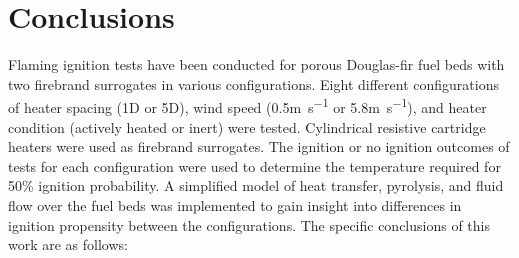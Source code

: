 \section{Conclusions}
    Flaming ignition tests have been conducted for porous Douglas-fir fuel beds with two firebrand surrogates in various configurations. Eight different configurations of heater spacing (1D or 5D), wind speed (0.5\si{\meter\per\second} or 5.8\si{\meter\per\second}), and heater condition (actively heated or inert) were tested. Cylindrical resistive cartridge heaters were used as firebrand surrogates. The ignition or no ignition outcomes of tests for each configuration were used to determine the temperature required for 50\% ignition probability. A simplified model of heat transfer, pyrolysis, and fluid flow over the fuel beds was implemented to gain insight into differences in ignition propensity between the configurations. The specific conclusions of this work are as follows:
